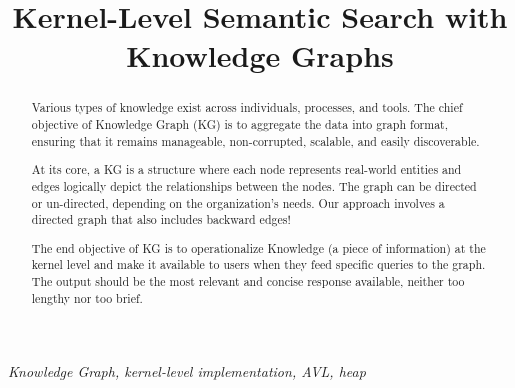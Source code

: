 \documentclass[conference]{IEEEtran}
\begin{document}
\title{ Kernel-Level Semantic Search with Knowledge Graphs
}

\author{\IEEEauthorblockN{}
\and
{}
\and
{}
\and
{}
}

\maketitle

\begin{abstract}
Various types of knowledge exist across individuals, processes, and tools.
The chief objective of Knowledge Graph (KG) is to aggregate the data into graph format, ensuring that it remains manageable, non-corrupted, scalable, and easily discoverable.

At its core, a KG is a structure where each node represents real-world entities and edges logically depict the relationships between the nodes. The graph can be directed or un-directed, depending on the organization's needs. Our approach involves a directed graph that also includes backward edges!

The end objective of KG is to operationalize Knowledge (a piece of information) at the kernel level and make it available to users when they feed specific queries to the graph. The output should be the most relevant and concise response available, neither too lengthy nor too brief.
\end{abstract}

\begin{IEEEkeywords}
\textit{Knowledge Graph, kernel-level implementation, AVL, heap}
\end{IEEEkeywords}
\end{document}
